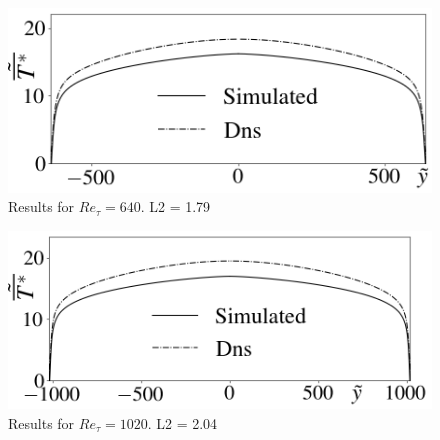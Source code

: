 \documentclass[xcolor=dvipsnames,8pt,aspectratio=34]{beamer}
\begin{document}
\begin{frame}
\begin{minipage}[h!]{0.5\textwidth}
				\begin{figure}
					\centering
					\includegraphics[angle=0, scale=0.24]{fotos_formatacao_final/Temperature_640_071_classico}
					\caption{Results for $Re_\tau = 640$. L2 = 1.79 }
				\end{figure}
			\end{minipage}
			\begin{minipage}[h!]{0.49\textwidth}
				\begin{figure}
					\centering
					\includegraphics[angle=0, scale=0.24]{fotos_formatacao_final/Temperature_1000_071_classico}
					\caption{Results for $Re_\tau = 1020$. L2 = 2.04}
				\end{figure}
			\end{minipage}		
		\end{frame}
	
	
	
	
		
\end{document}
